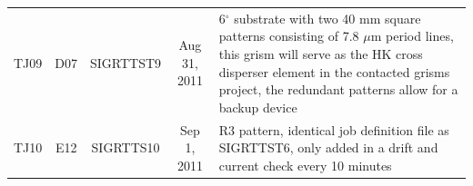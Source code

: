 \documentclass[]{spie}  %
\begin{document}
\begin{landscape}
\begin{longtable}{ccccp{8cm}}
	\cline{5-5}
	TJ09 & D07 & SIGRTTST9 & Aug 31, 2011 & 6$^{\circ}$ substrate with two 40 mm square patterns consisting of 7.8 $\mu$m period lines, this grism will serve as the HK cross disperser element in the contacted grisms project, the redundant patterns allow for a backup device\\	
	\cline{5-5}
	TJ10 & E12 & SIGRTTS10 & Sep 1, 2011 & R3 pattern, identical job definition file as SIGRTTST6, only added in a drift and current check every 10 minutes\\
	\hline
\end{longtable}
\end{landscape}	



\end{document}
